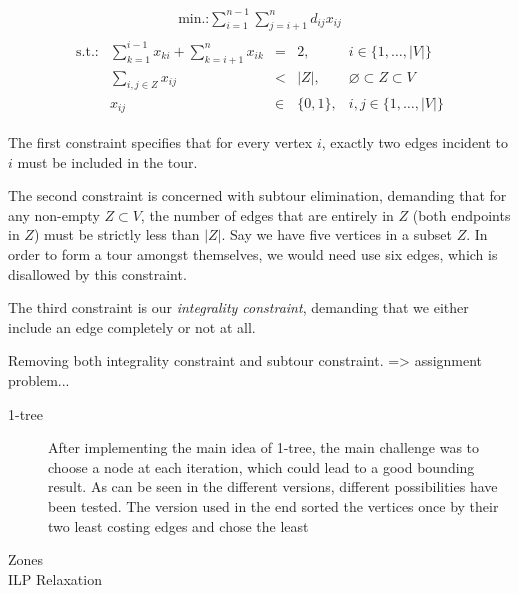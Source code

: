 \documentclass{article}
\begin{document}
\begin{align*}
  \text{min.:} \sum_{i=1}^{n-1}\sum_{j=i+1}^{n} d_{ij}x_{ij}
\end{align*}
\begin{align*}
  \begin{array}{lrcll}
    \text{s.t.:} & \displaystyle\sum_{k=1}^{i-1}x_{ki} + \displaystyle\sum_{k=i+1}^{n} x_{ik} &= &2, & i\in \{1,\dots,|V|\}\\
                 & \displaystyle\sum_{i,j\in Z} x_{ij} &< &|Z|, & \varnothing \subset Z \subset V\\
                 & x_{ij} &\in & \{0,1\}, & i,j \in \{1,\dots,|V|\}
  \end{array}
\end{align*}

The first constraint specifies that for every vertex $i$, exactly two
edges incident to $i$ must be included in the tour.

The second constraint is concerned with subtour elimination, demanding
that for any non-empty $Z\subset V$, the number of edges that are
entirely in $Z$ (both endpoints in $Z$) must be strictly less than
$|Z|$. Say we have five vertices in a subset $Z$. In order to form a
tour amongst themselves, we would need use six edges, which is
disallowed by this constraint.

The third constraint is our \emph{integrality constraint}, demanding
that we either include an edge completely or not at all.

Removing both integrality constraint and subtour constraint. => assignment problem...

\begin{description}
\item[1-tree] After implementing the main idea of 1-tree, the main challenge was to choose a node at each iteration, which could lead to a good bounding result. As can be seen in the different versions, different possibilities have been tested. The version used in the end sorted the vertices once by their two least costing edges and chose the least
\item[Zones]
\item[ILP Relaxation]
\end{description}

    
\end{document}
